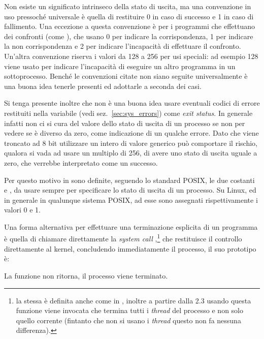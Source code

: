 Non esiste un significato intrinseco della stato di uscita, ma una convenzione
in uso pressoché universale è quella di restituire 0 in caso di successo e 1
in caso di fallimento. Una eccezione a questa convenzione è per i programmi
che effettuano dei confronti (come ), che usano 0 per indicare la
corrispondenza, 1 per indicare la non corrispondenza e 2 per indicare
l'incapacità di effettuare il confronto. Un'altra convenzione riserva i valori
da 128 a 256 per usi speciali: ad esempio 128 viene usato per indicare
l'incapacità di eseguire un altro programma in un sottoprocesso. Benché le
convenzioni citate non siano seguite universalmente è una buona idea tenerle
presenti ed adottarle a seconda dei casi.

Si tenga presente inoltre che non è una buona idea usare eventuali codici di
errore restituiti nella variabile  (vedi sez.~\ref{sec:sys_errors})
come \textit{exit status}. In generale infatti non ci si cura del valore dello
stato di uscita di un processo se non per vedere se è diverso da zero, come
indicazione di un qualche errore.  Dato che viene troncato ad 8 bit utilizzare
un intero di valore generico può comportare il rischio, qualora si vada ad
usare un multiplo di 256, di avere uno stato di uscita uguale a zero, che
verrebbe interpretato come un successo.

Per questo motivo in  sono definite, seguendo lo standard
POSIX, le due costanti  e , da
usare sempre per specificare lo stato di uscita di un processo. Su Linux, ed
in generale in qualunque sistema POSIX, ad esse sono assegnati rispettivamente
i valori 0 e 1.


Una forma alternativa per effettuare una terminazione esplicita di un
programma è quella di chiamare direttamente la \textit{system call}
,\footnote{la stessa è definita anche come  in
  , inoltre a partire dalla  2.3 usando questa
  funzione viene invocata  che termina tutti i
  \textit{thread} del processo e non solo quello corrente (fintanto che non si
  usano i \textit{thread} questo non
  fa nessuna differenza).} che restituisce il controllo direttamente al
kernel, concludendo immediatamente il processo, il suo prototipo è:

\begin{funcproto}{  
      } {La funzione non
    ritorna, il processo viene terminato.}
\end{funcproto}

